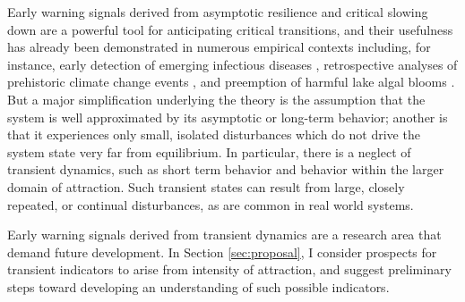 Early warning signals derived from asymptotic resilience and critical slowing down are a powerful tool for anticipating critical transitions, and their usefulness has already been demonstrated in numerous empirical contexts including, for instance, early detection of emerging infectious diseases \cite{brettDynamicalFootprintsEnable2020}, retrospective analyses of prehistoric climate change events \cite{dakosSlowingEarlyWarning2008a}, and preemption of harmful lake algal blooms \cite{paceReversalCyanobacterialBloom2017}. But a major simplification underlying the theory is the assumption that the system is well approximated by its asymptotic or long-term behavior; another is that it experiences only small, isolated disturbances which do not drive the system state very far from equilibrium. In particular, there is a neglect of transient dynamics, such as short term behavior and behavior within the larger domain of attraction. Such transient states can result from large, closely repeated, or continual disturbances, as are common in real world systems. 


%

Early warning signals derived from transient dynamics are a research area that demand future development. In Section \ref{sec:proposal}, I consider prospects for transient indicators to arise from intensity of attraction, and suggest preliminary steps toward developing an understanding of such possible indicators. 








